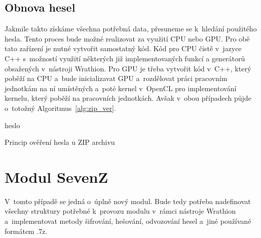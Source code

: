 \subsection{Obnova hesel}
Jakmile takto získáme všechna potřebná data, přesuneme se k~hledání použitého hesla. Tento proces
bude možné realizovat za využití CPU nebo GPU. Pro obě tato zařízení je nutné vytvořit samostatný
kód. Kód pro CPU čistě v~jazyce C++ s~možností využití některých již implementovaných funkcí a
generátorů obsažených v~nástroji Wrathion. Pro GPU je třeba vytvořit kód v~C++, který poběží na
CPU a~bude inicializavat GPU a~rozdělovat práci pracovním jednotkám na ní umístěných a~poté kernel
v~OpenCL pro implementování kernelu, který poběží na pracovních jednotkách. Avšak v~obou
případech půjde o~totožný Algoritmus~\ref{alg:zip_ver}.

\begin{algorithm}[ht]
    \SetStartEndCondition{ (}{)}{)}\SetAlgoBlockMarkers{}{}%
    \AlgoDisplayBlockMarkers\SetAlgoNoLine%
    \DontPrintSemicolon
    \Return heslo\;
    \caption{Princip ověření hesla u ZIP archivu}\label{alg:zip_ver}
\end{algorithm}

\section{Modul SevenZ}
V~tomto případě se jedná o~úplně nový modul. Bude tedy potřeba nadefinovat všechny struktury
potřebné k~provozu modulu v~rámci nástroje Wrathion a~implementovat metody šifrování, hešování,
odvozování hesel a~jiné používané formátem .7z.

